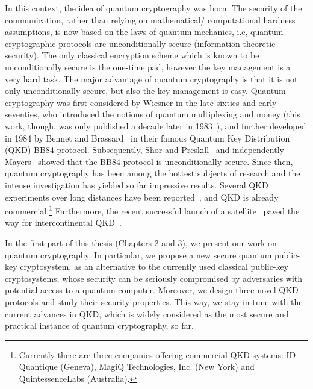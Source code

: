 In this context, the idea of quantum cryptography was born. The security of the communication, rather than relying on mathematical/ computational hardness assumptions, is now based on the laws of quantum mechanics, i.e, quantum cryptographic protocols are unconditionally secure (information-theoretic security). The only classical encryption scheme which is known to be unconditionally secure is the one-time pad, however the key management is a very hard task. The major advantage of quantum cryptography is that it is not only unconditionally secure, but also the key management is easy. Quantum cryptography was first considered by Wiesner in the late sixties and early seventies, who introduced the notions of quantum multiplexing and money (this work, though, was only published a decade later in 1983~\cite{wie:83}), and further developed in 1984 by Bennet and Brassard~\cite{ben:bra:84} in their famous Quantum Key Distribution (QKD) BB84 protocol. Subsequently, Shor and Preskill~\cite{sho:pre:00} and independently Mayers~\cite{may:01} showed that the BB84 protocol is unconditionally secure. Since then, quantum cryptography has been among the hottest subjects of research and the intense investigation has yielded so far impressive results. Several QKD experiments over long distances have been reported~\cite{urs:etal:07,sch:07,tak:sas:tam:koa:15,pug:kai:bou:jin:sul:agn:ani:mak:cho:hig:jen:17,idquantique}, and QKD is already commercial.\footnote{Currently there are three companies offering commercial QKD systems: ID Quantique (Geneva), MagiQ Technologies, Inc. (New York) and QuintessenceLabs (Australia).} Furthermore, the recent successful launch of a satellite~\cite{yin:etal:17} paved the way for intercontinental QKD~\cite{vie:bei:qkd:sat:18}. 

In the first part of this thesis (Chapters 2 and 3), we present our work on quantum cryptography. In particular, we  propose a new secure quantum public-key cryptosystem, as an alternative to the currently used classical public-key cryptosystems, whose security can be seriously compromised by adversaries with potential access to a quantum computer. Moreover, we design three novel QKD protocols and study their security properties. This way, we stay in tune with the current advances in QKD, which is widely considered as the most secure and practical instance of quantum cryptography, so far. 

